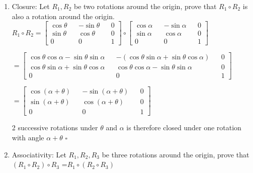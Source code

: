 \documentclass{article}
\begin{document}
    \begin{enumerate}
        \item Closure: Let $R_1, R_2$ be two rotations around the origin, prove that $R_1 \circ R_2$ is also a rotation around the origin.
        $R_1 \circ R_2 = \begin{bmatrix}
            \cos \theta && - \sin \theta && 0 \\ 
            \sin \theta && \cos \theta && 0 \\
            0  && 0  && 1 
        \end{bmatrix} \circ
        \begin{bmatrix}
            \cos \alpha && - \sin \alpha && 0  \\ 
            \sin \alpha && \cos \alpha && 0 \\
            0  && 0  && 1
        \end{bmatrix}$

        $ =\begin{bmatrix}
            \cos \theta \cos \alpha - \sin \theta \sin \alpha && - (\cos \theta \sin \alpha + \sin \theta \cos \alpha)  && 0 \\ 
            \cos \theta \sin \alpha + \sin \theta \cos \alpha && \cos \theta \cos \alpha - \sin \theta \sin \alpha  && 0 \\
            0  && 0  && 1 
        \end{bmatrix}$

        $ = \begin{bmatrix}
            \cos (\alpha + \theta)  && - \sin (\alpha + \theta) && 0 \\ 
            \sin (\alpha + \theta) && \cos (\alpha + \theta) && 0  \\
            0  && 0  && 1 
        \end{bmatrix}$

        2 successive rotations under $\theta$ and $\alpha$ is therefore closed under one rotation with angle $\alpha + \theta$ $\square$

        \item Associativity: Let $R_1, R_2, R_3$ be three rotations around the origin, prove that $(R_1 \circ R_2) \circ R_3 $ =$R_1 \circ (R_2 \circ R_3) $
        

\end{enumerate}
\end{document}
